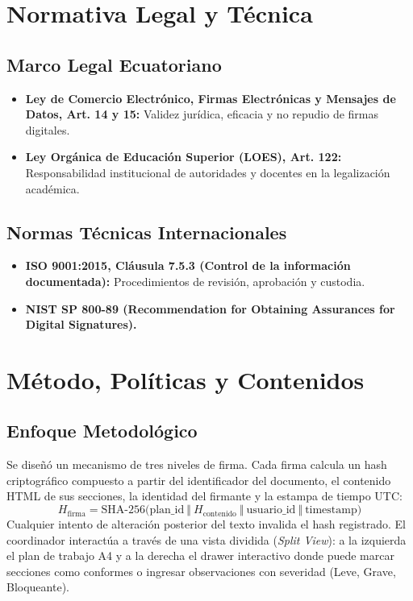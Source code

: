 \documentclass[12pt,a4paper]{article}
\begin{document}
\section{Normativa Legal y Técnica}
\subsection{Marco Legal Ecuatoriano}
\begin{itemize}[leftmargin=1.5em, itemsep=2pt]
    \item \textbf{Ley de Comercio Electrónico, Firmas Electrónicas y Mensajes de Datos, Art. 14 y 15:} Validez jurídica, eficacia y no repudio de firmas digitales.
    \item \textbf{Ley Orgánica de Educación Superior (LOES), Art. 122:} Responsabilidad institucional de autoridades y docentes en la legalización académica.
\end{itemize}
\subsection{Normas Técnicas Internacionales}
\begin{itemize}[leftmargin=1.5em, itemsep=2pt]
    \item \textbf{ISO 9001:2015, Cláusula 7.5.3 (Control de la información documentada):} Procedimientos de revisión, aprobación y custodia.
    \item \textbf{NIST SP 800-89 (Recommendation for Obtaining Assurances for Digital Signatures).}
\end{itemize}

\section{Método, Políticas y Contenidos}
\subsection{Enfoque Metodológico}
Se diseñó un mecanismo de tres niveles de firma. Cada firma calcula un hash criptográfico compuesto a partir del identificador del documento, el contenido HTML de sus secciones, la identidad del firmante y la estampa de tiempo UTC:
\begin{equation}
    H_{\text{firma}} = \text{SHA-256}\Big(\text{plan\_id} \ \Vert \ H_{\text{contenido}} \ \Vert \ \text{usuario\_id} \ \Vert \ \text{timestamp}\Big)
\end{equation}
Cualquier intento de alteración posterior del texto invalida el hash registrado. El coordinador interactúa a través de una vista dividida (\textit{Split View}): a la izquierda el plan de trabajo A4 y a la derecha el drawer interactivo donde puede marcar secciones como conformes o ingresar observaciones con severidad (Leve, Grave, Bloqueante).
\end{document}
